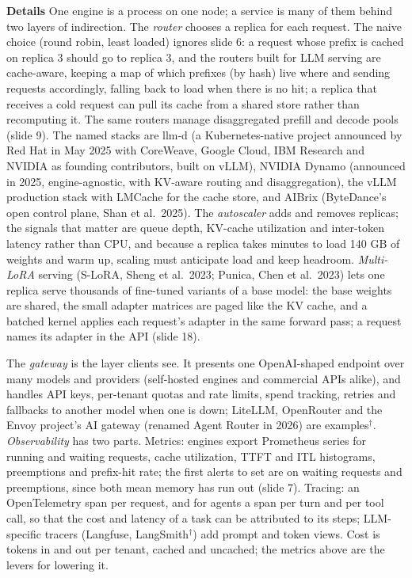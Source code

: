 \documentclass[11pt,letterpaper]{article}
\newcommand{\para}[1]{\medskip\noindent\textbf{#1}\quad}
\begin{document}
\para{Details} One engine is a process on one node; a service is many of them behind two layers of indirection. The \emph{router} chooses a replica for each request. The naive choice (round robin, least loaded) ignores slide 6: a request whose prefix is cached on replica 3 should go to replica 3, and the routers built for LLM serving are cache-aware, keeping a map of which prefixes (by hash) live where and sending requests accordingly, falling back to load when there is no hit; a replica that receives a cold request can pull its cache from a shared store rather than recomputing it. The same routers manage disaggregated prefill and decode pools (slide 9). The named stacks are llm-d (a Kubernetes-native project announced by Red Hat in May 2025 with CoreWeave, Google Cloud, IBM Research and NVIDIA as founding contributors, built on vLLM), NVIDIA Dynamo (announced in 2025, engine-agnostic, with KV-aware routing and disaggregation), the vLLM production stack with LMCache for the cache store, and AIBrix (ByteDance's open control plane, Shan et al.\ 2025). The \emph{autoscaler} adds and removes replicas; the signals that matter are queue depth, KV-cache utilization and inter-token latency rather than CPU, and because a replica takes minutes to load 140 GB of weights and warm up, scaling must anticipate load and keep headroom. \emph{Multi-LoRA} serving (S-LoRA, Sheng et al.\ 2023; Punica, Chen et al.\ 2023) lets one replica serve thousands of fine-tuned variants of a base model: the base weights are shared, the small adapter matrices are paged like the KV cache, and a batched kernel applies each request's adapter in the same forward pass; a request names its adapter in the API (slide 18).

The \emph{gateway} is the layer clients see. It presents one OpenAI-shaped endpoint over many models and providers (self-hosted engines and commercial APIs alike), and handles API keys, per-tenant quotas and rate limits, spend tracking, retries and fallbacks to another model when one is down; LiteLLM, OpenRouter and the Envoy project's AI gateway (renamed Agent Router in 2026) are examples$^\dagger$. \emph{Observability} has two parts. Metrics: engines export Prometheus series for running and waiting requests, cache utilization, TTFT and ITL histograms, preemptions and prefix-hit rate; the first alerts to set are on waiting requests and preemptions, since both mean memory has run out (slide 7). Tracing: an OpenTelemetry span per request, and for agents a span per turn and per tool call, so that the cost and latency of a task can be attributed to its steps; LLM-specific tracers (Langfuse, LangSmith$^\dagger$) add prompt and token views. Cost is tokens in and out per tenant, cached and uncached; the metrics above are the levers for lowering it.
\end{document}
